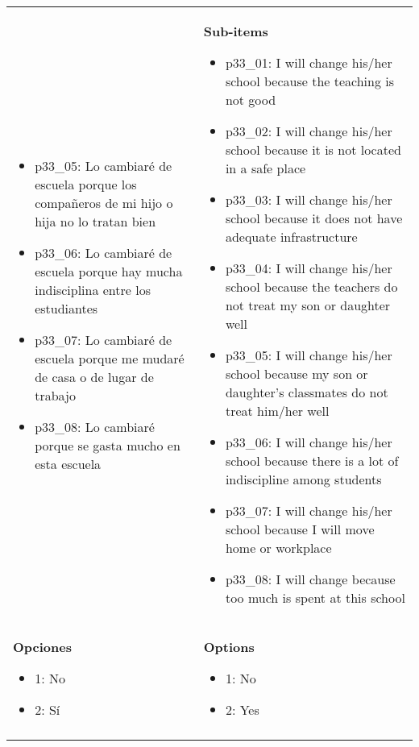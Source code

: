 \documentclass[11pt]{article}
\begin{document}
\begin{longtable}{@{}LL@{}}
\begin{itemize}[leftmargin=*]
\item p33\_05: Lo cambiaré de escuela porque los compañeros de mi hijo o hija no lo tratan bien
\item p33\_06: Lo cambiaré de escuela porque hay mucha indisciplina entre los estudiantes
\item p33\_07: Lo cambiaré de escuela porque me mudaré de casa o de lugar de trabajo
\item p33\_08: Lo cambiaré porque se gasta mucho en esta escuela\end{itemize} & \textbf{Sub-items}\par\begin{itemize}[leftmargin=*]\item p33\_01: I will change his/her school because the teaching is not good
\item p33\_02: I will change his/her school because it is not located in a safe place
\item p33\_03: I will change his/her school because it does not have adequate infrastructure
\item p33\_04: I will change his/her school because the teachers do not treat my son or daughter well
\item p33\_05: I will change his/her school because my son or daughter's classmates do not treat him/her well
\item p33\_06: I will change his/her school because there is a lot of indiscipline among students
\item p33\_07: I will change his/her school because I will move home or workplace
\item p33\_08: I will change because too much is spent at this school\end{itemize} \\
\textbf{Opciones}\par\begin{itemize}[leftmargin=*]\item 1: No
\item 2: Sí\end{itemize} & \textbf{Options}\par\begin{itemize}[leftmargin=*]\item 1: No
\item 2: Yes\end{itemize} \\
\addlinespace[4pt]
\end{longtable}
\end{document}
